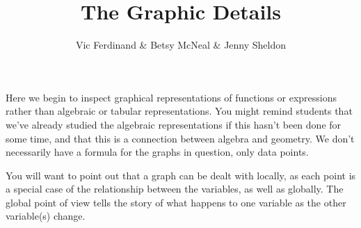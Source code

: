 \documentclass{ximera}
\title{The Graphic Details}
\author{Vic Ferdinand \& Betsy McNeal \& Jenny Sheldon}
\begin{document}
\begin{abstract}\end{abstract}
\maketitle

\begin{instructorIntro}
Here we begin to inspect graphical representations of functions or expressions rather than algebraic or tabular representations.  You might remind students that we've already studied the algebraic representations if this hasn't been done for some time, and that this is a connection between algebra and geometry.  We don't necessarily have a formula for the graphs in question, only data points.  

You will want to point out that a graph can be dealt with locally, as each point is a special case of the relationship between the variables, as well as globally.  The global point of view tells the story of what happens to one variable as the other variable(s) change.


\vskip 3.5in
\end{instructorIntro}
\end{document}
